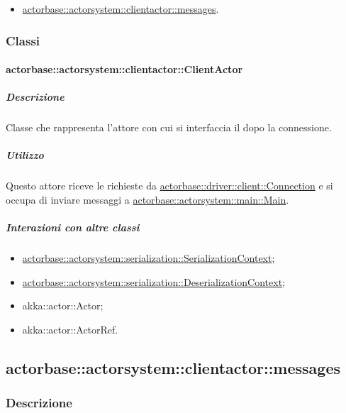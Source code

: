 \documentclass{scalatekids-article}
\begin{document}
\begin{itemize}
\item \hyperref[sec:actorbase::actorsystem::clientactor::messages]{actorbase::actorsystem::clientactor::messages}.
\end{itemize}

\subsubsection{Classi}

\paragraph{actorbase::actorsystem::clientactor::ClientActor}
\label{sec:actorbase::actorsystem::clientactor::ClientActor}

\subparagraph{Descrizione}

Classe che rappresenta l'attore con cui si interfaccia il  dopo
la connessione.

\subparagraph{Utilizzo}

Questo attore riceve le richieste da \hyperref[sec:actorbase::driver::client::Connection]{actorbase::driver::client::Connection}
e si occupa di inviare messaggi a \hyperref[sec:actorbase::actorsystem::main::Main]{actorbase::actorsystem::main::Main}.

\subparagraph{Interazioni con altre classi}

\begin{itemize}
\item \hyperref[sec:actorbase::actorsystem::serialization::SerializationContext]{actorbase::actorsystem::serialization::SerializationContext};
\item \hyperref[sec:actorbase::actorsystem::serialization::DeserializationContext]{actorbase::actorsystem::serialization::DeserializationContext};
\item akka::actor::Actor;
\item akka::actor::ActorRef.
\end{itemize}

\subsection{actorbase::actorsystem::clientactor::messages}
\label{sec:actorbase::actorsystem::clientactor::messages}

\subsubsection{Descrizione}
\end{document}
